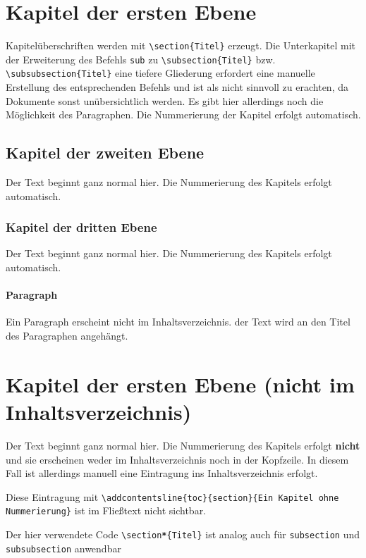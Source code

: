 \section{Kapitel der ersten Ebene}
Kapitelüberschriften werden mit \texttt{\textbackslash section\{Titel\}} erzeugt. Die Unterkapitel mit der Erweiterung des Befehls \texttt{sub} zu \texttt{\textbackslash subsection\{Titel\}} bzw. \texttt{\textbackslash subsubsection\{Titel\}} eine tiefere Gliederung erfordert eine manuelle Erstellung des entsprechenden Befehls und ist als nicht sinnvoll zu erachten, da Dokumente sonst unübersichtlich werden. Es gibt hier allerdings noch die Möglichkeit des Paragraphen. Die Nummerierung der Kapitel erfolgt automatisch.
\subsection{Kapitel der zweiten Ebene}
Der Text beginnt ganz normal hier. Die Nummerierung des Kapitels erfolgt automatisch.
\subsubsection{Kapitel der dritten Ebene}
Der Text beginnt ganz normal hier. Die Nummerierung des Kapitels erfolgt automatisch.
\paragraph{Paragraph}
Ein Paragraph erscheint nicht im Inhaltsverzeichnis. der Text wird an den Titel des Paragraphen angehängt.

\section*{Kapitel der ersten Ebene (nicht im Inhaltsverzeichnis)}
Der Text beginnt ganz normal hier. Die Nummerierung des Kapitels erfolgt \textbf{nicht} und sie erscheinen weder im Inhaltsverzeichnis noch in der Kopfzeile. In diesem Fall ist allerdings manuell eine Eintragung ins Inhaltsverzeichnis erfolgt. 

Diese Eintragung mit \texttt{\textbackslash addcontentsline\{toc\}\{section\}\{Ein Kapitel ohne Nummerierung\}} ist im Fließtext nicht sichtbar.

Der hier verwendete Code \texttt{\textbackslash section\textbf{*}\{Titel\}} ist analog auch für \texttt{subsection} und \texttt{subsubsection} anwendbar
\clearpage